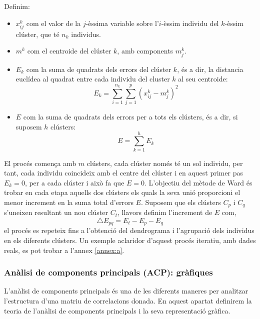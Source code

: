 \documentclass[english]{article}
\begin{document}
Definim:
\begin{itemize}
\item $x_{ij}^k$ com el valor de la $j$-èssima variable sobre l'$i$-èssim individu del $k$-èssim clúster, que té $n_k$ individus.
\item $m^k$ com el centroide del clúster $k$, amb components $m_{j}^k$.
\item $E_k$ com la suma de quadrats dels errors del clúster $k$, és a dir, la distancia euclídea al quadrat entre cada individu del cluster $k$ al seu centroide:
\begin{equation*}
E_k = \sum_{i=1}^{n_k}\sum_{j=1}^{p}(x_{ij}^k - m_{j}^k)^2
\end{equation*}
\item $E$ com la suma de quadrats dels errors per a tots els clústers, és a dir, si suposem $h$ clústers:
\begin{equation*}
E = \sum_{k=1}^{h} E_k
\end{equation*}
\end{itemize}
El procés comen\c{c}a amb $m$ clústers, cada clúster només té un sol individu, per tant, cada individu coincideix amb el centre del clúster i en aquest primer pas $E_k=0$, per a cada clúster i això fa que $E=0$. L'objectiu del mètode de Ward és trobar en cada etapa aquells dos clústers els quals la seva unió proporcioni el menor increment en la suma total d'errors $E$. Suposem que els clústers $C_p$ i $C_q$ s'uneixen resultant un nou clúster $C_t$, llavors definim l'increment de $E$ com,
\begin{equation*}
\bigtriangleup E_{pq} = E_t - E_p - E_q
\end{equation*}
el procés es repeteix fins a l'obtenció del dendrograma i l'agrupació dels individus en els diferents clústers. Un exemple aclaridor d'aquest procés iteratiu, amb dades reals, es pot trobar a l'annex \ref{annex:a}.
\newpage
\subsubsection{Anàlisi de components principals (ACP): gràfiques}
L'anàlisi de components principals és una de les diferents maneres per analitzar l'estructura d'una matriu de correlacions donada. En aquest apartat definirem la teoria de l'anàlisi de components principals i la seva representació gràfica.
\\
\end{document}
